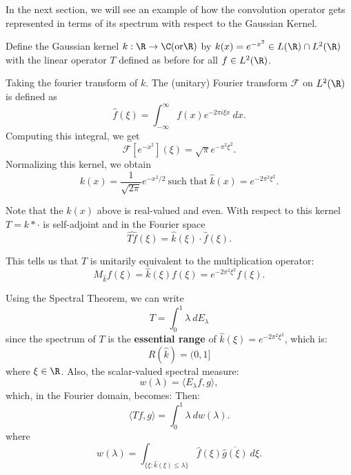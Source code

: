 In the next section, we will see an example of how the convolution operator gets represented in terms of its spectrum with respect to the Gaussian Kernel. 

\begin{eg}
    Define the Gaussian kernel \( k: \R \to \C (\text{or} \R) \) by \( k(x) = e^{- x^{2}} \in L(\R) \cap L^{2}(\R)  \) with the linear operator \( T   \) defined as before for all \( f \in L^{2}(\R) \).
 
Taking the fourier transform of \( k  \). The (unitary) Fourier transform \( \mathcal{F} \) on \( L^{2}(\R) \) is defined as 
\[  \hat{f}(\xi) = \int_{ - \infty  }^{ \infty  }  f(x) e^{-2 \pi i \xi x } \ dx.  \]
Computing this integral, we get 
\[  \mathcal{F}[e^{- x^{2}}](\xi) = \sqrt{ \pi } e^{- \pi^{2} \xi^{2}}. \]
Normalizing this kernel, we obtain
\[  k(x) = \frac{ 1  }{ \sqrt{ 2 \pi  }  } e^{- x^{2} /2} \ \text{such that} \ \hat{k}(x) = e^{-2\pi^{2} \xi^{2}}. \]

Note that the \( k(x) \) above is real-valued and even. With respect to this kernel \( T = k * \cdot \) is self-adjoint and in the Fourier space
\[  \hat{Tf}(\xi) = \hat{k}(\xi) \cdot \hat{f}(\xi). \]

This tells us that \( T  \) is unitarily equivalent to the multiplication operator:
\[  {M}_{\hat{k}}f(\xi)  = \hat{k}(\xi)f(\xi) = e^{- 2 \pi^{2} \xi^{2}}f(\xi).\]

Using the Spectral Theorem, we can write
\[  T = \int_{ 0 }^{ 1 }  \lambda  \ d {E}_{\lambda}  \]
since the spectrum of \( T  \) is the \textbf{essential range} of \( \hat{k}(\xi) = e^{-2 \pi^{2} \xi^{2}} \), which is: 
\[  R(\hat{k}) = (0,1]  \]
where \( \xi \in \R  \). Also, the scalar-valued spectral measure:
\[  w(\lambda) = \langle {E}_{\lambda} f  ,  g  \rangle, \]
which, in the Fourier domain, becomes:
Then:
\[ \langle Tf  , g  \rangle = \int_{ 0 }^{ 1 }  \lambda  \ dw (\lambda). \]
where
\[ w(\lambda) = \int_{ \{  \xi : \hat{k}(\xi) \leq \lambda\}  } \hat{f}(\xi) \overline{\hat{g}(\xi)}   \ d \xi. \]

\end{eg}




 

